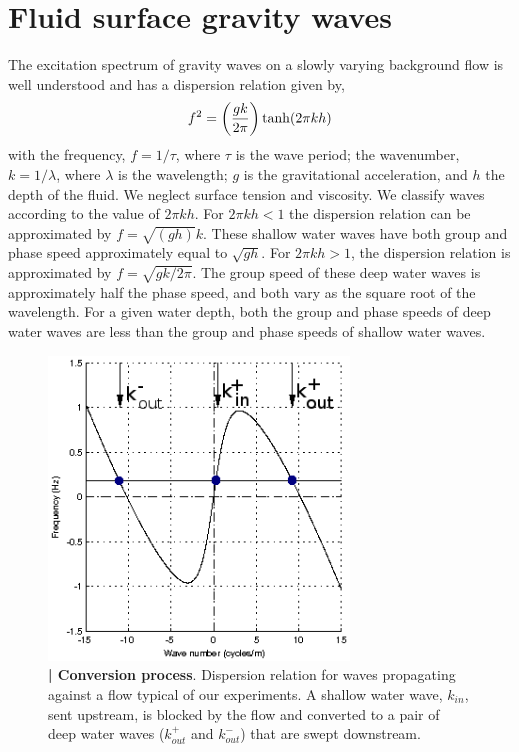 \documentclass[12pt,aps%
]{revtex4}
\def\bea{\begin{eqnarray}}
\def\eea{\end{eqnarray}}
\begin{document}
\section{\bf Fluid surface gravity waves}

The excitation spectrum of gravity waves on a slowly varying background flow
is well understood and has a dispersion relation given by, 
\bea
f^2=\left({gk\over 2\pi}\right) \tanh(2\pi k h)
\eea
with the frequency, $f = 1/\tau$, where $\tau$ is the wave period; the
wavenumber, $ k =
1/\lambda$, where $\lambda$ is the wavelength; $g$ is the gravitational
acceleration, and $h$ the
depth of the fluid. We neglect surface tension and viscosity. We classify
waves according to the value of $2\pi kh$. For $2\pi  kh < 1$ the dispersion relation
can be approximated by $f = \sqrt{(gh)}k$. These shallow water waves have both
group and phase speed approximately equal to $\sqrt{gh}$.  For $2\pi kh > 1$, the
dispersion relation is approximated by  $f = \sqrt{gk/2\pi}$. The group speed of
these deep water waves is approximately half the phase speed, and both vary as
the square root of the wavelength. For a given water depth, both the group and
phase speeds of deep water waves are less than the group and phase speeds of
shallow water waves.



\begin{figure}
\begin{center}
\includegraphics[width=80mm]{waterfall-1.eps}
\caption{{\bf  | Conversion process}.  Dispersion relation for waves
propagating against a flow typical of our experiments. A shallow water wave,
$k_{in}$, sent upstream, is blocked by the flow and converted to a pair of deep
water waves ($k^+_{out}$  and $k^-_{out}$) that are swept downstream. 
}

\end{center}
\end{figure}
\end{document}
